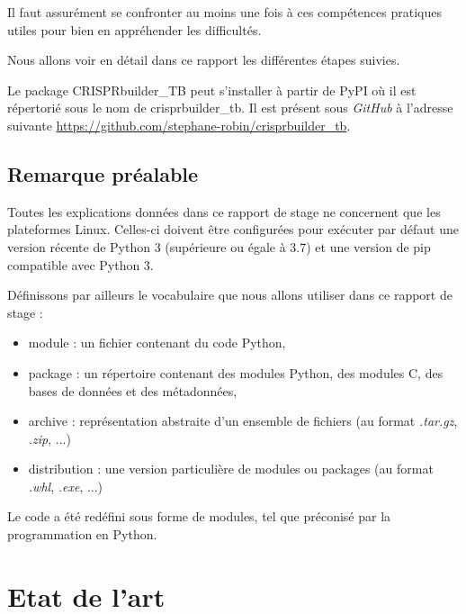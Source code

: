 \documentclass[twoside,a4paper,11pt,frenchb,openany]{report}
\begin{document}
Il faut assurément se confronter au moins une fois à ces compétences pratiques utiles pour bien en appréhender les difficultés.

Nous allons voir en détail dans ce rapport les différentes étapes suivies.

Le package CRISPRbuilder\_TB peut s'installer à partir de PyPI où il est répertorié sous le nom de crisprbuilder\_tb. Il est présent sous \textit{GitHub} à l'adresse suivante \url{https://github.com/stephane-robin/crisprbuilder_tb}.




\section{Remarque préalable}

Toutes les explications données dans ce rapport de stage ne concernent que les plateformes Linux. Celles-ci doivent être configurées pour exécuter par défaut une version récente de Python 3 (supérieure ou égale à 3.7) et une version de pip compatible avec Python 3.

Définissons par ailleurs le vocabulaire que nous allons utiliser dans ce rapport de stage :
\begin{itemize}
\item {}module : un fichier contenant du code Python,
\item package : un répertoire contenant des modules Python, des modules C, des bases de données et des métadonnées,
\item {}archive : représentation abstraite d'un ensemble de fichiers (au format \textit{.tar.gz}, \textit{.zip}, ...)
\item {}distribution : une version particulière de modules ou packages (au format \textit{.whl}, \textit{.exe}, ...)
\end{itemize}


Le code a été redéfini sous forme de modules, tel que préconisé par la programmation en Python.




\chapter{Etat de l'art}


\end{document}
